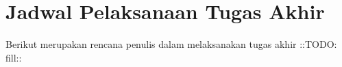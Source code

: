 \section{Jadwal Pelaksanaan Tugas Akhir}

Berikut merupakan rencana penulis dalam melaksanakan tugas akhir ::TODO: fill::